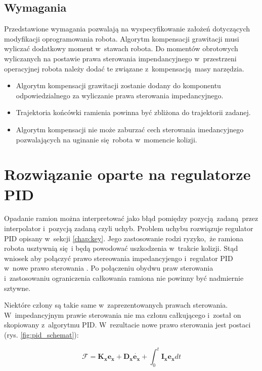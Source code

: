 \subsection{Wymagania}
Przedstawione wymagania pozwalają na wyspecyfikowanie założeń dotyczących modyfikacji oprogramowania robota. Algorytm kompensacji grawitacji musi wyliczać dodatkowy moment w~stawach robota. Do momentów obrotowych wyliczanych na postawie  prawa sterowania impendancyjnego w~przestrzeni operacyjnej robota należy dodać te związane z~kompensacją masy narzędzia.
\begin{itemize}
	\item Algorytm kompensacji grawitacji zostanie dodany do komponentu odpowiedzialnego za wyliczanie prawa sterowania impedancyjnego.
	\item Trajektoria końcówki ramienia powinna być zbliżona do trajektorii zadanej.
	\item Algorytm kompensacji nie może zaburzać cech sterowania imedancyjnego pozwalających na uginanie się robota w~momencie kolizji.
\end{itemize}



\section{Rozwiązanie oparte na regulatorze PID}
\label{chap:rozw_pid}
Opadanie ramion można interpretować jako błąd pomiędzy pozycją zadaną przez interpolator i~pozycją zadaną czyli uchyb. Problem uchybu rozwiązuje regulator PID opisany w~sekcji \ref{chap:key}. Jego zastosowanie rodzi ryzyko, że ramiona robota usztywnią się i będą powodować uszkodzenia w~trakcie kolizji. Stąd wniosek aby połączyć prawo stereowania impedancyjengo i~regulator PID w~nowe prawo sterowania \cite{bib:gravity2, bib:rozw_pid1}. Po połączeniu obydwu praw sterowania i~zastosowaniu ograniczenia całkowania ramiona nie powinny być nadmiernie sztywne. 

Niektóre człony są takie same w~zaprezentowanych prawach sterowania. W~impedancyjnym prawie sterowania nie ma członu całkującego i~został on skopiowany z~algorytmu PID. W~rezultacie nowe prawo sterowania jest postaci (rys. \ref{fig:pid_schemat}):

\begin{equation}
\label{eq:prawo_ster}
\boldsymbol{\mathcal{F}} = \boldsymbol{K_x}\boldsymbol{e_x} + \boldsymbol{D_x}\dot{\boldsymbol{e_x}} + \int_{0}^{t}  \boldsymbol{I_x}\boldsymbol{e_x}dt
\end{equation}

